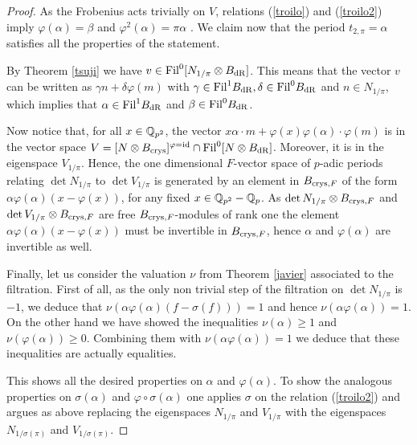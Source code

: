 \begin{proof}
As the Frobenius acts trivially on $V$, relations (\ref{troilo}) and (\ref{troilo2}) imply $ \varphi(\alpha) = \beta$ and $ \varphi^2(\alpha) = \pi \alpha$ . We claim now that the period $t_{2,\pi}=\alpha$ satisfies all the properties of the statement.

 By Theorem \ref{tsuji} we have $v\in \textnormal{Fil}^0[N_{1/\pi} \otimes B_{\mathrm{dR}}]$. This means that the vector $v$ can be written as $\gamma n + \delta \varphi(m)$ with $\gamma \in \textnormal{Fil}^{1}B_{\mathrm{dR}}, \delta \in \textnormal{Fil}^0B_{\mathrm{dR}}$ and $n \in N_{1/\pi}$, which implies that $\alpha \in \textnormal{Fil}^{1}B_{\mathrm{dR}}$ and  $\beta \in \textnormal{Fil}^{0}B_{\mathrm{dR}}$.

Now notice that, for all $x\in \mathbb{Q}_{p^2}$, the vector $x\alpha \cdot m+ \varphi(x)\varphi(\alpha) \cdot \varphi(m)$ is in the vector space $V=[N\otimes B_{\textnormal{crys}}]^{\varphi=\mathrm{id}} \cap  \textnormal{Fil}^0[N \otimes B_{\mathrm{dR}}] $.
Moreover, it is in the eigenspace $V_{1/\pi}$.
Hence,  the one dimensional $F$-vector space of $p$-adic periods relating $\det N_{1/\pi}$ to $\det V_{1/\pi}$ is generated by an element in $B_{\textnormal{crys},F}$ of the form $\alpha \varphi(\alpha) (x-\varphi( x) )$, for any fixed $x \in \mathbb{Q}_{p^2} - \mathbb{Q}_p$.
As $\det N_{1/\pi}\otimes B_{\textnormal{crys},F}$ and $\det V_{1/\pi}\otimes B_{\textnormal{crys},F}$ are free $B_{\textnormal{crys},F}$-modules of rank one the element $\alpha \varphi(\alpha) (x-\varphi( x) )$ must be invertible in $B_{\textnormal{crys},F}$, hence $\alpha$ and  $\varphi(\alpha)$ are invertible as well.

 Finally, let us  consider the valuation $\nu$ from Theorem \ref{javier} associated  to the filtration.
 First of all, as the only non trivial step of the filtration on $\det N_{1/\pi}$ is  $-1$, we deduce that $\nu ( \alpha \varphi(\alpha) (f-\sigma( f) ))=1$ and hence $\nu ( \alpha \varphi(\alpha))=1$.
 On the other hand we have showed the inequalities $\nu ( \alpha) \geq 1$ and  $\nu (  \varphi(\alpha))\geq 0$.
 Combining them with $\nu ( \alpha \varphi(\alpha)  )=1$ we deduce that these inequalities are actually equalities.

 This shows all the desired properties on $\alpha$ and $ \varphi(\alpha)$.
 To show the analogous properties on $\sigma (\alpha)$ and $ \varphi \circ \sigma (\alpha)$ one applies $\sigma$ on the relation (\ref{troilo2}) and argues as above replacing the eigenspaces $N_{1/\pi}$ and $V_{1/\pi}$ with the eigenspaces $N_{1/\sigma(\pi)}$  and $V_{1/\sigma(\pi)}$.
\end{proof}

